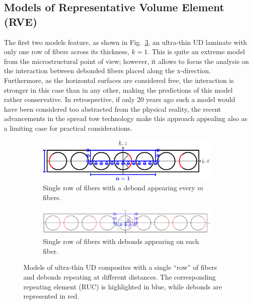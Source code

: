 \documentclass[review]{elsarticle}
\begin{document}
\subsection{Models of Representative Volume Element (RVE)}\label{subsec:rve}

The first two models feature, as shown in Fig.~\ref{fig:laminateModelsA}, an ultra-thin UD laminate with only one row of fibers across its thickness, $k=1$. This is quite an extreme model from the microstructural point of view; however, it allows to focus the analysis on the interaction between debonded fibers placed along the x-direction. Furthermore, as the horizontal surfaces are considered free, the interaction is stronger in this case than in any other, making the predictions of this model rather conservative. In retrospective, if only 20 years ago such a model would have been considered too abstracted from the physical reality, the recent advancements in the spread tow technology make this approach appealing also as a limiting case for practical considerations.

\begin{figure}[!h]
\centering
    \begin{subfigure}[b]{\textwidth}
        \includegraphics[width=\textwidth]{freeThinPly.pdf}
        \caption{Single row of fibers with a debond appearing every $m$ fibers.}\label{subfig:freethinply}
    \end{subfigure}

    \begin{subfigure}[b]{\textwidth}
        \includegraphics[width=\textwidth]{freeThinPlyAllDebonds.pdf}
        \caption{Single row of fibers with debonds appearing on each fiber.}\label{subfig:freethinplyalldebonds}
    \end{subfigure}

\caption{Models of ultra-thin UD composites with a single ``row'' of fibers and debonds repeating at different distances. The corresponding repeating element (RUC) is highlighted in blue, while debonds are represented in red.}\label{fig:laminateModelsA}
\end{figure}
\end{document}
